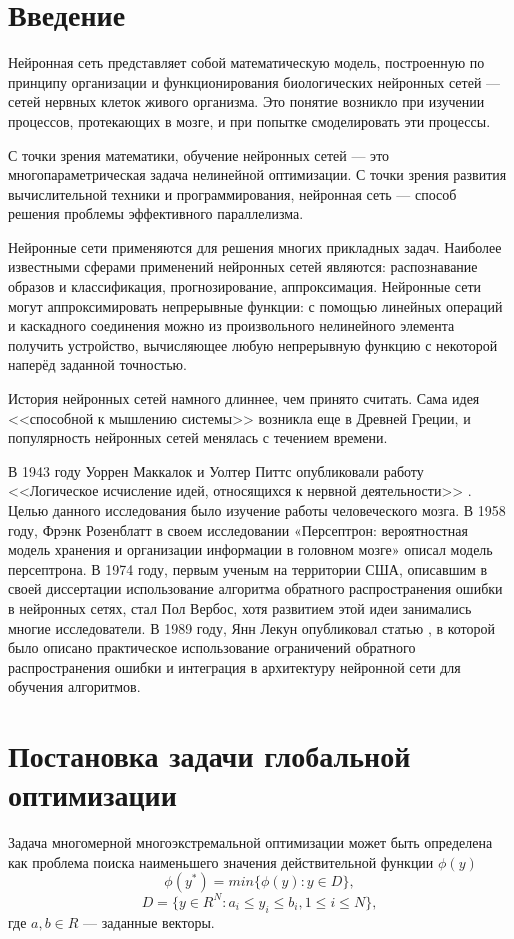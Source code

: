 \documentclass[11pt, oneside, a4paper]{article}
\begin{document}
\bigskip

\section{Введение}

Нейронная сеть представляет собой математическую модель, построенную по принципу организации и функционирования биологических нейронных сетей --- сетей нервных клеток живого организма. Это понятие возникло при изучении процессов, протекающих в мозге, и при попытке смоделировать эти процессы. 

С точки зрения математики, обучение нейронных сетей --- это многопараметрическая задача нелинейной оптимизации. С точки зрения развития вычислительной техники и программирования, нейронная сеть --- способ решения проблемы эффективного параллелизма.

Нейронные сети применяются для решения многих прикладных задач. Наиболее известными сферами применений нейронных сетей являются: распознавание образов и классификация, прогнозирование, аппроксимация.
Нейронные сети могут аппроксимировать непрерывные функции: с помощью линейных операций и каскадного соединения можно из произвольного нелинейного элемента получить устройство, вычисляющее любую непрерывную функцию с некоторой наперёд заданной точностью.

История нейронных сетей намного длиннее, чем принято считать. Сама идея <<способной к мышлению системы>> возникла еще в Древней Греции, и популярность нейронных сетей менялась с течением времени. 

В 1943 году Уоррен Маккалок и Уолтер Питтс опубликовали работу <<Логическое исчисление идей, относящихся к нервной деятельности>> \cite{fio_bib3}. Целью данного исследования было изучение работы человеческого мозга. В 1958 году, Фрэнк Розенблатт в своем исследовании «Персептрон: вероятностная модель хранения и организации информации в головном мозге» \cite{fio_bib4} описал модель персептрона. В 1974 году, первым ученым на территории США, описавшим в своей диссертации \cite{fio_bib5} использование алгоритма обратного распространения ошибки в нейронных сетях, стал Пол Вербос, хотя развитием этой идеи занимались многие исследователи. В 1989 году, Янн Лекун опубликовал статью \cite{fio_bib6}, в которой было описано практическое использование ограничений обратного распространения ошибки и интеграция в архитектуру нейронной сети для обучения алгоритмов. 

\section{Постановка задачи глобальной оптимизации}
Задача многомерной многоэкстремальной оптимизации может быть определена как проблема поиска наименьшего значения действительной функции $\phi(y)$
\begin{equation*}   %
\phi(y^*) = min\{\phi(y):y\in D\},
\end{equation*}
\begin{equation}   %
D = \{y \in R^N : a_i \leq y_i \leq b_i,
1 \leq i \leq N \},
\end{equation}
где $a,b \in R$ --- заданные векторы.
\end{document}
